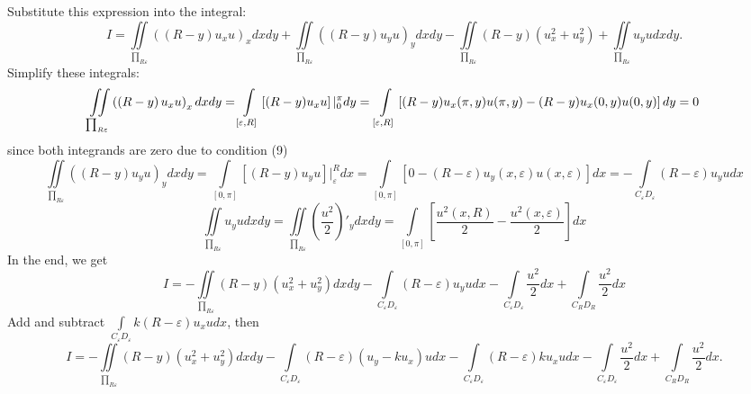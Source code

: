 \documentclass[9pt]{article}
\begin{document}
	Substitute this expression into the integral:
	\begin{equation*}
		I	=	\iint\limits_{\prod_{R\varepsilon}} \left( \left(R - y\right) u_x u\right)_x dx dy  + \iint\limits_{\prod_{R\varepsilon}} \left( \left(R - y\right) u_y u\right)_y dx dy
		- \iint\limits_{\prod_{R\varepsilon}} \left(R- y\right) \left(u_x^2 + u_y^2\right) + \iint\limits_{\prod_{R\varepsilon}} u_y u dx dy.
	\end{equation*}
	Simplify these integrals:
	\begin{equation*}
		\iint\limits_{\prod_{R\varepsilon}} \left( \left(R - y\right) u_x u\right)_x dx dy = \int\limits_{[\varepsilon, R]} \left[(R-y)u_xu\right] \vert_0^\pi dy = \\ \int\limits_{[\varepsilon, R]} \left[(R-y) u_x(\pi, y)u(\pi,y) - (R-y) u_x(0, y)u(0,y)\right]dy = 0
	\end{equation*}
	since both integrands are zero due to condition (9)
	\begin{equation*}
		\iint\limits_{\prod_{R\varepsilon}} \left( \left(R - y\right) u_y u\right)_y dx dy = \int\limits_{[0,\pi]} \left[\left(R - y\right) u_y u\right] \vert_\varepsilon^R dx =
		\int\limits_{[0,\pi]} \left[0 - \left(R - \varepsilon \right) u_y(x, \varepsilon) u(x, \varepsilon) \right] dx =  - \int\limits_{C_\varepsilon D_\varepsilon} \left(R - \varepsilon \right) u_yu dx
	\end{equation*}
	\begin{equation*}
		\iint\limits_{\prod_{R\varepsilon}} u_y u dx dy = \iint\limits_{\prod_{R\varepsilon}} \left(\dfrac{u^2}{2}\right)'_ydx dy = \int\limits_{[0,\pi]} \left[\dfrac{u^2(x,R)}{2} - \dfrac{u^2(x, \varepsilon)}{2}\right] dx
	\end{equation*}
	In the end, we get
	\begin{equation*}
		I = - \iint\limits_{\prod_{R\varepsilon}} \left(R - y\right) \left(u_x^2 + u_y^2\right) dx dy
		- \int\limits_{C_\varepsilon D_\varepsilon} \left(R - \varepsilon\right) u_y u dx
		-\int\limits_{C_\varepsilon D_\varepsilon} \dfrac{u^2}{2} dx + \int\limits_{C_R D_R} \dfrac{u^2}{2} dx
	\end{equation*}
	Add and subtract $\int\limits_{C_\varepsilon D_\varepsilon} k\left(R - \varepsilon\right) u_x u dx$, then
	\begin{equation*}
		I = - \iint\limits_{\prod_{R\varepsilon}} \left(R - y\right) \left(u_x^2 + u_y^2\right) dx dy -
		\int\limits_{C_\varepsilon D_\varepsilon} \left(R - \varepsilon \right) \left(u_y - ku_x\right)u dx - \int\limits_{C_\varepsilon D_\varepsilon} \left(R - \varepsilon\right) k u_x u dx - \int\limits_{C_\varepsilon D_\varepsilon}\dfrac{u^2}{2} dx + \int\limits_{C_R D_R} \dfrac{u^2}{2}dx.
	\end{equation*}
\end{document}
